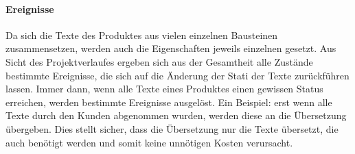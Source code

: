 \paragraph{Ereignisse} Da sich die Texte des Produktes aus vielen einzelnen Bausteinen zusammensetzen, werden auch die Eigenschaften jeweils einzelnen gesetzt. Aus Sicht des Projektverlaufes ergeben sich aus der Gesamtheit alle Zustände bestimmte Ereignisse, die sich auf die Änderung der Stati der Texte zurückführen lassen. Immer dann, wenn alle Texte eines Produktes einen gewissen Status erreichen, werden bestimmte Ereignisse ausgelöst. Ein Beispiel: erst wenn alle Texte durch den Kunden abgenommen wurden, werden diese an die Übersetzung übergeben. Dies stellt sicher, dass die Übersetzung nur die Texte übersetzt, die auch benötigt werden und somit keine unnötigen Kosten verursacht.
